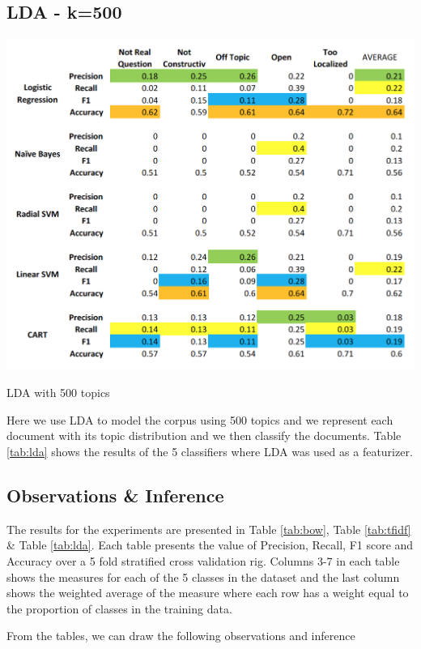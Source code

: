 \documentclass{article} %
\begin{document}
\subsection{LDA - k=500}
\begin{table}[!htpb]
    \centering
    \includegraphics[scale=0.6]{figs/LDA}
    \caption{LDA with 500 topics}
    \label{tab:lda}
\end{table}
Here we use LDA to model the corpus using 500 topics and we represent each document with its topic distribution and we then classify the documents. Table \ref{tab:lda} shows the results of the 5 classifiers where LDA was used as a featurizer.


\subsection{Observations \& Inference}

The results for the experiments are presented in Table \ref{tab:bow}, Table \ref{tab:tfidf} \& Table \ref{tab:lda}. Each table presents the  value of Precision, Recall, F1 score and Accuracy over a 5 fold stratified cross validation rig. Columns 3-7 in each table shows the measures for each of the 5 classes in the dataset and the last column shows the weighted average of the measure where each row has a weight equal to the proportion of classes in the training data.

From the tables, we can draw the following observations and inference
\end{document}
